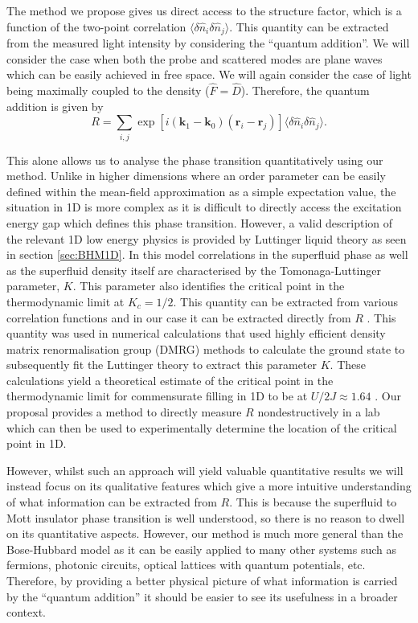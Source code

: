 The method we propose gives us direct access to the structure factor,
which is a function of the two-point correlation $\langle \delta
\hat{n}_i \delta \hat{n}_j \rangle$. This quantity can be extracted
from the measured light intensity by considering the ``quantum
addition''. We will consider the case when both the probe and
scattered modes are plane waves which can be easily achieved in free
space. We will again consider the case of light being maximally
coupled to the density ($\hat{F} = \hat{D}$). Therefore, the quantum
addition is given by
\begin{equation} 
  R =\sum_{i, j} \exp[i (\mathbf{k}_1 - \mathbf{k}_0)
  (\mathbf{r}_i - \mathbf{r}_j)] \langle \delta \hat{n}_i \delta
  \hat{n}_j \rangle.
\end{equation}

This alone allows us to analyse the phase transition quantitatively
using our method. Unlike in higher dimensions where an order parameter
can be easily defined within the mean-field approximation as a simple
expectation value, the situation in 1D is more complex as it is
difficult to directly access the excitation energy gap which defines
this phase transition. However, a valid description of the relevant 1D
low energy physics is provided by Luttinger liquid theory
\cite{giamarchi} as seen in section \ref{sec:BHM1D}. In this model
correlations in the superfluid phase as well as the superfluid density
itself are characterised by the Tomonaga-Luttinger parameter,
$K$. This parameter also identifies the critical point in the
thermodynamic limit at $K_c = 1/2$. This quantity can be extracted
from various correlation functions and in our case it can be extracted
directly from $R$ \cite{ejima2011}. This quantity was used in
numerical calculations that used highly efficient density matrix
renormalisation group (DMRG) methods to calculate the ground state to
subsequently fit the Luttinger theory to extract this parameter
$K$. These calculations yield a theoretical estimate of the critical
point in the thermodynamic limit for commensurate filling in 1D to be
at $U/2J \approx 1.64$ \cite{ejima2011}. Our proposal provides a
method to directly measure $R$ nondestructively in a lab which can
then be used to experimentally determine the location of the critical
point in 1D.

However, whilst such an approach will yield valuable quantitative
results we will instead focus on its qualitative features which give a
more intuitive understanding of what information can be extracted from
$R$. This is because the superfluid to Mott insulator phase transition
is well understood, so there is no reason to dwell on its quantitative
aspects. However, our method is much more general than the
Bose-Hubbard model as it can be easily applied to many other systems
such as fermions, photonic circuits, optical lattices with quantum
potentials, etc. Therefore, by providing a better physical picture of
what information is carried by the ``quantum addition'' it should be
easier to see its usefulness in a broader context.

